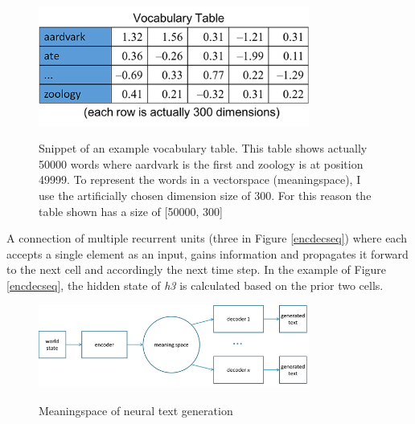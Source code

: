 \begin{figure}
	\begin{center}
		\includegraphics[width=3.5in]{photos/w1-16}\\
		\caption{Snippet of an example vocabulary table. This table shows actually 50000 words where aardvark is the first and zoology is at position 49999. To represent the words in a vectorspace (meaningspace), I use the artificially chosen dimension size of 300. For this reason the table shown has a size of [50000, 300]\cite{mugan}}\label{voctable}
	\end{center}
\end{figure}

A connection of multiple recurrent units (three in Figure \ref{encdecseq}) where each accepts a single element as an input, gains information and propagates it forward to the next cell and accordingly the next time step. In the example of Figure \ref{encdecseq}, the hidden state of \textit{h3} is calculated based on the prior two cells.

\begin{figure}
	\begin{center}
		\includegraphics[width=3.5in]{photos/meaningspace}\\
		\caption{Meaningspace of neural text generation \cite{mugan}}\label{meaningspace}
	\end{center}
\end{figure}

